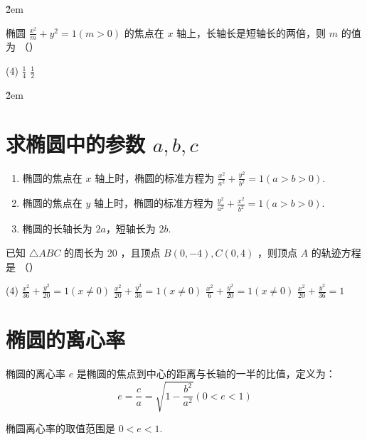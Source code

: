 \v{2em}

\begin{example}
    椭圆 $\frac{x^2}{m}+y^2=1(m>0)$ 的焦点在 $x$ 轴上，长轴长是短轴长的两倍，则 $m$ 的值为 （\qquad）
    \begin{tasks}(4)
        \task $\frac{1}{4}$
        \task $\frac{1}{2}$
    \end{tasks}
\end{example}

\v{2em}

\section{求椭圆中的参数 $a,b,c$}

\begin{theorem}[椭圆的几何性质]
    \begin{enumerate}
        \item 椭圆的焦点在 $x$ 轴上时，椭圆的标准方程为 $\frac{x^2}{a^2} + \frac{y^2}{b^2} = 1 (a>b>0)$.
        \item 椭圆的焦点在 $y$ 轴上时，椭圆的标准方程为 $\frac{y^2}{a^2} + \frac{x^2}{b^2} = 1 (a>b>0)$.
        \item 椭圆的长轴长为 $2a$，短轴长为 $2b$.
    \end{enumerate}
\end{theorem}

\begin{example}
    已知 $\triangle A B C$ 的周长为 20 ，且顶点 $B(0,-4), C(0,4)$ ，则顶点 $A$ 的轨迹方程是 （\qquad）
    \begin{tasks}(4)
        \task $\frac{x^2}{36}+\frac{y^2}{20}=1(x \neq 0)$
        \task $\frac{x^2}{20}+\frac{y^2}{36}=1(x \neq 0)$
        \task $\frac{x^2}{6}+\frac{y^2}{20}=1(x \neq 0)$
        \task $\frac{x^2}{20}+\frac{y^2}{36}=1$
    \end{tasks}
\end{example}

\vspace{6em}

\section{椭圆的离心率}

\begin{definition}
    椭圆的离心率 $e$ 是椭圆的焦点到中心的距离与长轴的一半的比值，定义为：
    $$e = \frac{c}{a} = \sqrt{1 - \frac{b^2}{a^2}} (0<e<1)$$
    \begin{warning}
        椭圆离心率的取值范围是 $0<e<1$.
    \end{warning}
\end{definition}

